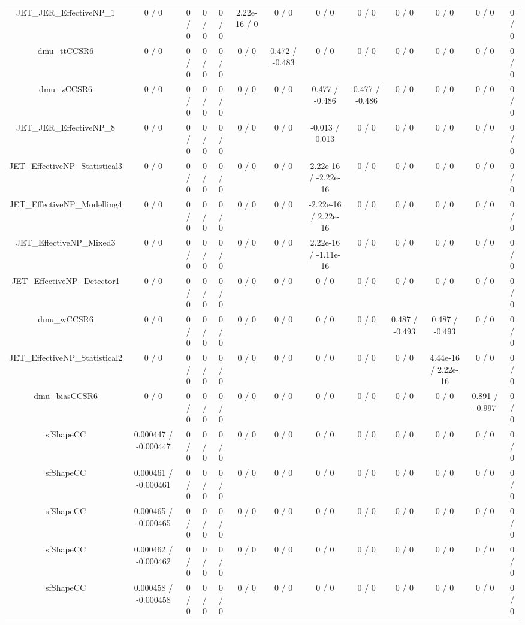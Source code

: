 \documentclass[10pt]{article}
\begin{document}
\begin{table}[htbp]
\begin{center}
\begin{tabular}{|c|c|c|c|c|c|c|c|c|c|c|c|c|}
  JET_JER_EffectiveNP_1 & 0 / 0 & 0 / 0 & 0 / 0 & 0 / 0 & 2.22e-16 / 0 & 0 / 0 & 0 / 0 & 0 / 0 & 0 / 0 & 0 / 0 & 0 / 0 & 0 / 0 \\ 
  dmu_ttCCSR6 & 0 / 0 & 0 / 0 & 0 / 0 & 0 / 0 & 0 / 0 & 0.472 / -0.483 & 0 / 0 & 0 / 0 & 0 / 0 & 0 / 0 & 0 / 0 & 0 / 0 \\ 
  dmu_zCCSR6 & 0 / 0 & 0 / 0 & 0 / 0 & 0 / 0 & 0 / 0 & 0 / 0 & 0.477 / -0.486 & 0.477 / -0.486 & 0 / 0 & 0 / 0 & 0 / 0 & 0 / 0 \\ 
  JET_JER_EffectiveNP_8 & 0 / 0 & 0 / 0 & 0 / 0 & 0 / 0 & 0 / 0 & 0 / 0 & -0.013 / 0.013 & 0 / 0 & 0 / 0 & 0 / 0 & 0 / 0 & 0 / 0 \\ 
  JET_EffectiveNP_Statistical3 & 0 / 0 & 0 / 0 & 0 / 0 & 0 / 0 & 0 / 0 & 0 / 0 & 2.22e-16 / -2.22e-16 & 0 / 0 & 0 / 0 & 0 / 0 & 0 / 0 & 0 / 0 \\ 
  JET_EffectiveNP_Modelling4 & 0 / 0 & 0 / 0 & 0 / 0 & 0 / 0 & 0 / 0 & 0 / 0 & -2.22e-16 / 2.22e-16 & 0 / 0 & 0 / 0 & 0 / 0 & 0 / 0 & 0 / 0 \\ 
  JET_EffectiveNP_Mixed3 & 0 / 0 & 0 / 0 & 0 / 0 & 0 / 0 & 0 / 0 & 0 / 0 & 2.22e-16 / -1.11e-16 & 0 / 0 & 0 / 0 & 0 / 0 & 0 / 0 & 0 / 0 \\ 
  JET_EffectiveNP_Detector1 & 0 / 0 & 0 / 0 & 0 / 0 & 0 / 0 & 0 / 0 & 0 / 0 & 0 / 0 & 0 / 0 & 0 / 0 & 0 / 0 & 0 / 0 & 0 / 0 \\ 
  dmu_wCCSR6 & 0 / 0 & 0 / 0 & 0 / 0 & 0 / 0 & 0 / 0 & 0 / 0 & 0 / 0 & 0 / 0 & 0.487 / -0.493 & 0.487 / -0.493 & 0 / 0 & 0 / 0 \\ 
  JET_EffectiveNP_Statistical2 & 0 / 0 & 0 / 0 & 0 / 0 & 0 / 0 & 0 / 0 & 0 / 0 & 0 / 0 & 0 / 0 & 0 / 0 & 4.44e-16 / 2.22e-16 & 0 / 0 & 0 / 0 \\ 
  dmu_biasCCSR6 & 0 / 0 & 0 / 0 & 0 / 0 & 0 / 0 & 0 / 0 & 0 / 0 & 0 / 0 & 0 / 0 & 0 / 0 & 0 / 0 & 0.891 / -0.997 & 0 / 0 \\ 
  sfShapeCC & 0.000447 / -0.000447 & 0 / 0 & 0 / 0 & 0 / 0 & 0 / 0 & 0 / 0 & 0 / 0 & 0 / 0 & 0 / 0 & 0 / 0 & 0 / 0 & 0 / 0 \\ 
  sfShapeCC & 0.000461 / -0.000461 & 0 / 0 & 0 / 0 & 0 / 0 & 0 / 0 & 0 / 0 & 0 / 0 & 0 / 0 & 0 / 0 & 0 / 0 & 0 / 0 & 0 / 0 \\ 
  sfShapeCC & 0.000465 / -0.000465 & 0 / 0 & 0 / 0 & 0 / 0 & 0 / 0 & 0 / 0 & 0 / 0 & 0 / 0 & 0 / 0 & 0 / 0 & 0 / 0 & 0 / 0 \\ 
  sfShapeCC & 0.000462 / -0.000462 & 0 / 0 & 0 / 0 & 0 / 0 & 0 / 0 & 0 / 0 & 0 / 0 & 0 / 0 & 0 / 0 & 0 / 0 & 0 / 0 & 0 / 0 \\ 
  sfShapeCC & 0.000458 / -0.000458 & 0 / 0 & 0 / 0 & 0 / 0 & 0 / 0 & 0 / 0 & 0 / 0 & 0 / 0 & 0 / 0 & 0 / 0 & 0 / 0 & 0 / 0 \\ 

\end{tabular}
\end{center}
\end{table}
\end{document}
